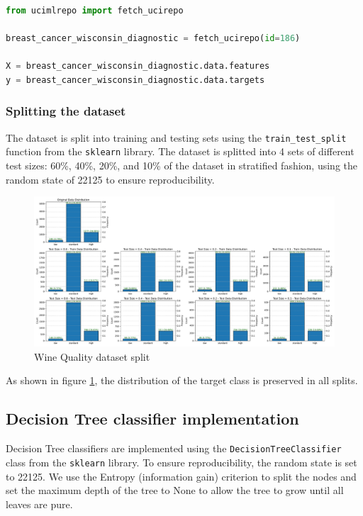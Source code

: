 \lstset{style=code}
\begin{lstlisting}[language=Python]
from ucimlrepo import fetch_ucirepo 

breast_cancer_wisconsin_diagnostic = fetch_ucirepo(id=186) 
    
X = breast_cancer_wisconsin_diagnostic.data.features 
y = breast_cancer_wisconsin_diagnostic.data.targets 
\end{lstlisting}

\subsubsection{Splitting the dataset}

The dataset is split into training and testing sets using the \texttt{train\_test\_split} function from the \texttt{sklearn} library. 
The dataset is splitted into 4 sets of different test sizes: 60\%, 40\%, 20\%, and 10\% of the dataset in stratified fashion, using the random state of 22125 to ensure reproducibility.

\begin{figure}[H]
    \centering
    \includegraphics[width=\textwidth]{figures/wine_quality_split.pdf}
    \caption{Wine Quality dataset split}
    \label{fig:wine_quality_split}
\end{figure}

As shown in figure \ref{fig:wine_quality_split}, the distribution of the target class is preserved in all splits.

\subsection{Decision Tree classifier implementation}

Decision Tree classifiers are implemented using the \texttt{DecisionTreeClassifier} class from the \texttt{sklearn} library. 
To ensure reproducibility, the random state is set to 22125. 
We use the Entropy (information gain) criterion to split the nodes and set the maximum depth of the tree to None to allow the tree to grow until all leaves are pure.

